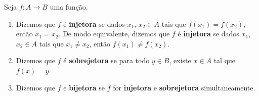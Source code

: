 \begin{definicao}
    Seja $f : A \to B$ uma função.
    \begin{enumerate}[label={\roman*})]
        \item Dizemos que $f$ é \textbf{injetora} se dados $x_1$, $x_2 \in A$ tais que $f(x_1) = f(x_2)$, então $x_1 = x_2$. De modo equivalente, dizemos que $f$ é \textbf{injetora} se dados $x_1$, $x_2 \in A$ tais que $x_1 \ne x_2$, então $f(x_1) \ne f(x_2)$.

        \item Dizemos que $f$ é \textbf{sobrejetora} se para todo $y \in B$, existe $x \in A$ tal que $f(x) = y$.

        \item Dizemos que $f$ e \textbf{bijetora} se $f$ for \textbf{injetora} e \textbf{sobrejetora} simultaneamente.
    \end{enumerate}
\end{definicao}

